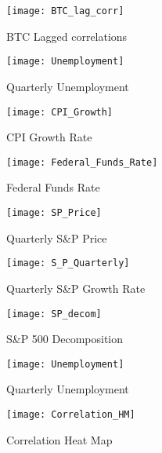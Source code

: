 \documentclass{beamer}
\begin{document}
        \begin{frame}
	\begin{figure}
			\texttt{[image: BTC\_lag\_corr]}
			\caption{BTC Lagged correlations}
			\label{fig:BTCcorr}
		\end{figure}
	\end{frame}
	\begin{frame}
	\begin{figure}
			\texttt{[image: Unemployment]}
			\caption{Quarterly Unemployment}
			\label{fig:Unemp}
		\end{figure}
	\end{frame}
	\begin{frame}
	\begin{figure}
			\texttt{[image: CPI\_Growth]}
			\caption{CPI Growth Rate}
			\label{fig:Inf}
		\end{figure}
	\end{frame}
	\begin{frame}
	\begin{figure}
			\texttt{[image: Federal\_Funds\_Rate]}
			\caption{Federal Funds Rate}
			\label{fig:FED}
		\end{figure}
	\end{frame}
	\begin{frame}
	\begin{figure}
			\texttt{[image: SP\_Price]}
			\caption{Quarterly S\&P Price}
			\label{fig:sPP}
		\end{figure}
	\end{frame}
	\begin{frame}
	\begin{figure}
	\texttt{[image: S\_P\_Quarterly]}
			\caption{Quarterly S\&P Growth Rate}
			\label{fig:sP}
			
		\end{figure}
	\end{frame}
		\begin{frame}
	\begin{figure}
			\texttt{[image: SP\_decom]}
			\caption{S\&P 500 Decomposition }
			\label{fig:sPPP}
		\end{figure}
	\end{frame}

	
	\begin{frame}
	\begin{figure}
			\texttt{[image: Unemployment]}
			\caption{Quarterly Unemployment}
			\label{fig:Unemp}
		\end{figure}
	\end{frame}
         \begin{frame}
	\begin{figure}
			\texttt{[image: Correlation\_HM]}
			\caption{Correlation Heat Map}
			\label{fig:Correlation All}
		\end{figure}
	\end{frame}
\end{document}
